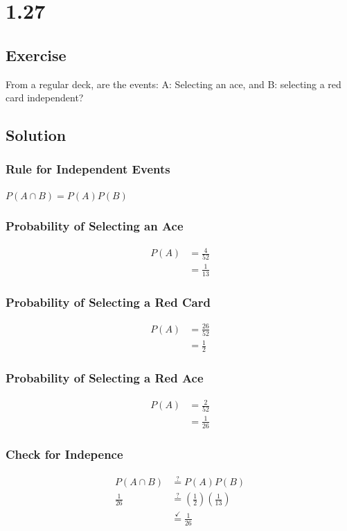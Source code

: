 \documentclass[12pt]{article}
\begin{document}
\section{1.27}
\subsection{Exercise}
From a regular deck, are the events: A: Selecting an ace, and B: selecting a red card independent?

\subsection{Solution}
\subsubsection{Rule for Independent Events}
$P(A \cap B) = P(A)P(B)$

\subsubsection{Probability of Selecting an Ace}
\begin{align*}
P(A) & = \frac{4}{52}\\
& = \frac{1}{13}
\end{align*}

\subsubsection{Probability of Selecting a Red Card}
\begin{align*}
P(A) & = \frac{26}{52}\\
& = \frac{1}{2}
\end{align*}

\subsubsection{Probability of Selecting a Red Ace}
\begin{align*}
P(A) & = \frac{2}{52}\\
& = \frac{1}{26}
\end{align*}

\subsubsection{Check for Indepence}
\begin{align*}
P(A \cap B) & \stackrel{?}{=} P(A)P(B)\\
\frac{1}{26}& \stackrel{?}{=} (\frac{1}{2})(\frac{1}{13})\\
& \stackrel{\checkmark}{=} \frac{1}{26}
\end{align*}
\end{document}
